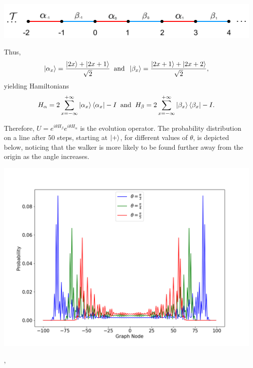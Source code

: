 \begin{center}
	\includegraphics[scale=0.30]{img/tesselation.png}
\end{center}
Thus, 
\begin{equation}
	\ket{\alpha_x} = \frac{\ket{2x} + \ket{2x+1}}{\sqrt{2}}\; \; \text{and}\; \; \ket{\beta_x} = \frac{\ket{2x+1}+\ket{2x+2}}{\sqrt{2}},
\end{equation}
yielding Hamiltonians 
\begin{equation}
	H_\alpha = 2\sum_{x=-\infty}^{+\infty}\ket{\alpha_{x}}\bra{\alpha_x} - I \; \; \text{and}\; \;  H_\beta = 2\sum_{x=-\infty}^{+\infty}\ket{\beta_{x}}\bra{\beta_x} - I.
\end{equation}

Therefore, $U = e^{i\theta H_\beta}e^{i\theta H_\alpha}$ is the  evolution operator. The probability
distribution  on a line after 50 steps, starting at $\ket{+}$, for different values of $\theta$, is depicted below,    
noticing that the walker is more likely to be found further away from the origin
as the angle increases.
\begin{center}
\includegraphics[scale=0.30]{img/stagqwMultiple.png}
\end{center},


